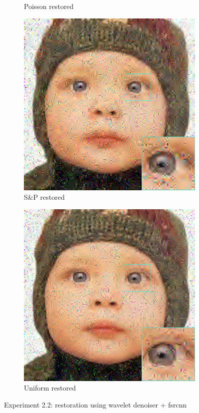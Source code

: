 \begin{figure}
\begin{subfigure}{0.24\textwidth}
		\caption{Poisson restored}
	\end{subfigure}
	\begin{subfigure}{0.24\textwidth}
		\includegraphics[width=\textwidth]{images/exp2.2/salt.png}
		\caption{S\&P restored}
	\end{subfigure}
	\begin{subfigure}{0.24\textwidth}
		\includegraphics[width=\textwidth]{images/exp2.2/uniform.png}
		\caption{Uniform restored}
	\end{subfigure}
	\caption{Experiment 2.2: restoration using wavelet denoiser $+$ \gls{fsrcnn}}
	\label{fig:exp2.2}
\end{figure}


